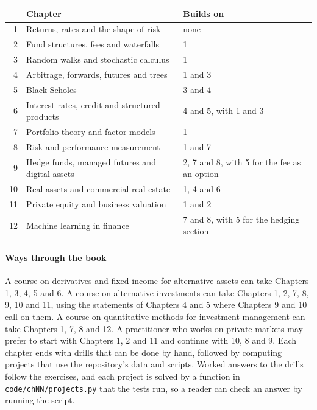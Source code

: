 \begin{center}\small
\begin{tabular}{@{}rlp{}@{}}
\toprule
& Chapter & Builds on\\
\midrule
1 & Returns, rates and the shape of risk & none\\
2 & Fund structures, fees and waterfalls & 1\\
3 & Random walks and stochastic calculus & 1\\
4 & Arbitrage, forwards, futures and trees & 1 and 3\\
5 & Black-Scholes & 3 and 4\\
6 & Interest rates, credit and structured products & 4 and 5, with 1 and 3\\
7 & Portfolio theory and factor models & 1\\
8 & Risk and performance measurement & 1 and 7\\
9 & Hedge funds, managed futures and digital assets & 2, 7 and 8, with 5 for the fee as an option\\
10 & Real assets and commercial real estate & 1, 4 and 6\\
11 & Private equity and business valuation & 1 and 2\\
12 & Machine learning in finance & 7 and 8, with 5 for the hedging section\\
\bottomrule
\end{tabular}
\end{center}

\paragraph{Ways through the book}
A course on derivatives and fixed income for alternative assets can take Chapters 1, 3, 4, 5 and 6. A
course on alternative investments can take Chapters 1, 2, 7, 8, 9, 10 and 11, using the statements of
Chapters 4 and 5 where Chapters 9 and 10 call on them. A course on quantitative methods for investment
management can take Chapters 1, 7, 8 and 12. A practitioner who works on private markets may prefer to
start with Chapters 1, 2 and 11 and continue with 10, 8 and 9. Each chapter ends with drills that can be
done by hand, followed by computing projects that use the repository's data and scripts. Worked answers
to the drills follow the exercises, and each project is solved by a function in
\texttt{code/chNN/projects.py} that the tests run, so a reader can check an answer by running the script.

